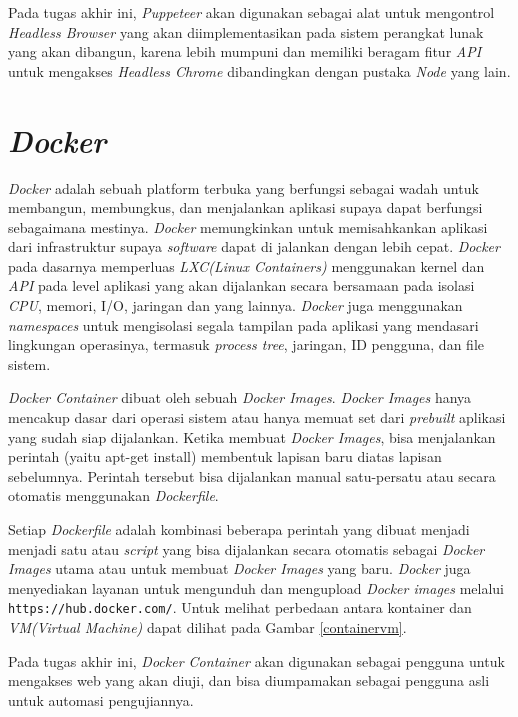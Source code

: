 			\indent Pada tugas akhir ini, \textit{Puppeteer} akan digunakan sebagai alat untuk mengontrol \textit{Headless Browser} yang akan diimplementasikan pada sistem perangkat lunak yang akan dibangun, karena lebih mumpuni dan memiliki beragam fitur \textit{API} untuk mengakses \textit{Headless Chrome} dibandingkan dengan pustaka \textit{Node} yang lain.
		
	\section{\textit{Docker}}
		\textit{Docker} adalah sebuah platform terbuka yang berfungsi sebagai wadah untuk membangun, membungkus, dan menjalankan aplikasi supaya dapat berfungsi sebagaimana mestinya. \textit{Docker} memungkinkan untuk memisahkankan aplikasi dari infrastruktur supaya \textit{software} dapat di jalankan dengan lebih cepat. \textit{Docker} pada dasarnya memperluas \textit{LXC(Linux Containers)} menggunakan kernel dan \textit{API} pada level aplikasi yang akan dijalankan secara bersamaan pada isolasi \textit{CPU}, memori, I/O, jaringan dan yang lainnya. \textit{Docker} juga menggunakan \textit{namespaces} untuk mengisolasi segala tampilan pada aplikasi yang mendasari lingkungan operasinya, termasuk \textit{process tree}, jaringan, ID pengguna, dan file sistem. 
		
		\indent \textit{Docker Container} dibuat oleh sebuah \textit{Docker Images}. \textit{Docker Images} hanya mencakup dasar dari operasi sistem atau hanya memuat set dari \textit{prebuilt} aplikasi yang sudah siap dijalankan. Ketika membuat \textit{Docker Images}, bisa menjalankan perintah (yaitu apt-get install) membentuk lapisan baru diatas lapisan sebelumnya. Perintah tersebut bisa dijalankan manual satu-persatu atau secara otomatis menggunakan \textit{Dockerfile}. 
		
		\indent Setiap \textit{Dockerfile} adalah kombinasi beberapa perintah yang dibuat menjadi menjadi satu atau \textit{script} yang bisa dijalankan secara otomatis sebagai \textit{Docker Images} utama atau untuk membuat \textit{Docker Images} yang baru\cite{docker}\cite{docker_2}. \textit{Docker} juga menyediakan layanan untuk mengunduh dan mengupload \textit{Docker images} melalui \texttt{https://hub.docker.com/}. Untuk melihat perbedaan antara kontainer dan \textit{VM(Virtual Machine)} dapat dilihat pada Gambar \ref{containervm}.
	
		\indent Pada tugas akhir ini, \textit{Docker Container} akan digunakan sebagai pengguna untuk mengakses web yang akan diuji, dan bisa diumpamakan sebagai pengguna asli untuk automasi pengujiannya. \\
		
